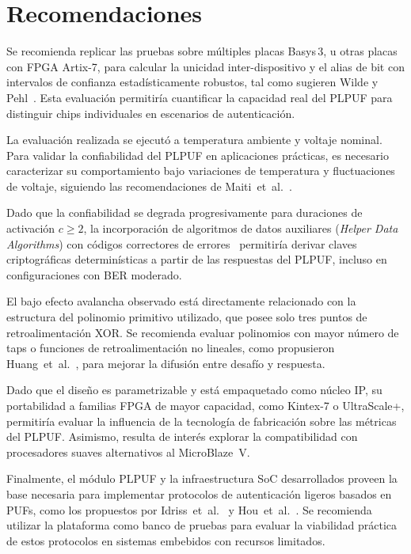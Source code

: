 \section{Recomendaciones}

Se recomienda replicar las pruebas sobre múltiples placas Basys\,3, u otras
placas con FPGA Artix-7, para calcular la unicidad inter-dispositivo y el
alias de bit con intervalos de confianza estadísticamente robustos, tal como
sugieren Wilde y Pehl~\cite{wilde_2020_confidence}. Esta evaluación
permitiría cuantificar la capacidad real del PLPUF para distinguir chips
individuales en escenarios de autenticación.

La evaluación realizada se ejecutó a temperatura ambiente y voltaje nominal.
Para validar la confiabilidad del PLPUF en aplicaciones prácticas, es
necesario caracterizar su comportamiento bajo variaciones de temperatura y
fluctuaciones de voltaje, siguiendo las recomendaciones de
Maiti~et~al.~\cite{maiti_2012_systematic}.

Dado que la confiabilidad se degrada progresivamente para duraciones de
activación $c \geq 2$, la incorporación de algoritmos de datos auxiliares
(\textit{Helper Data Algorithms}) con códigos correctores de
errores~\cite{delvaux_2015_helper} permitiría derivar claves criptográficas
determinísticas a partir de las respuestas del PLPUF, incluso en
configuraciones con BER moderado.

El bajo efecto avalancha observado está directamente relacionado con la
estructura del polinomio primitivo utilizado, que posee solo tres puntos de
retroalimentación XOR. Se recomienda evaluar polinomios con mayor número de
taps o funciones de retroalimentación no lineales, como propusieron
Huang~et~al.~\cite{huang_2024_nlfsr}, para mejorar la difusión entre desafío
y respuesta.

Dado que el diseño es parametrizable y está empaquetado como núcleo IP, su
portabilidad a familias FPGA de mayor capacidad, como Kintex-7 o UltraScale+,
permitiría evaluar la influencia de la tecnología de fabricación sobre las
métricas del PLPUF. Asimismo, resulta de interés explorar la compatibilidad
con procesadores suaves alternativos al MicroBlaze~V.

Finalmente, el módulo PLPUF y la infraestructura SoC desarrollados proveen la
base necesaria para implementar protocolos de autenticación ligeros basados en
PUFs, como los propuestos por Idriss~et~al.~\cite{idriss_2021_lightweight} y
Hou~et~al.~\cite{hou_2023_modeling}. Se recomienda utilizar la plataforma
como banco de pruebas para evaluar la viabilidad práctica de estos protocolos
en sistemas embebidos con recursos limitados.

